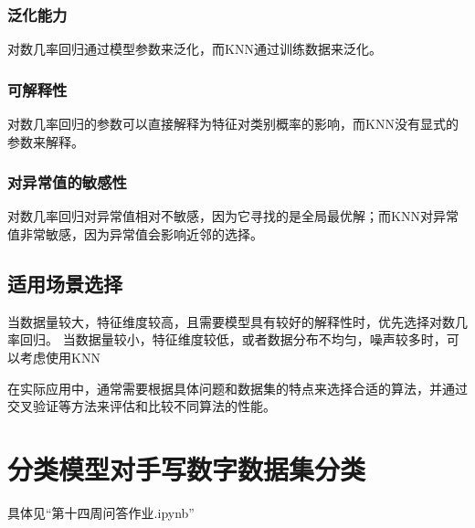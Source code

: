 \documentclass[10pt]{article}
\begin{document}
\subsubsection{泛化能力}对数几率回归通过模型参数来泛化，而KNN通过训练数据来泛化。
	\subsubsection{可解释性}对数几率回归的参数可以直接解释为特征对类别概率的影响，而KNN没有显式的参数来解释。
\subsubsection{对异常值的敏感性}对数几率回归对异常值相对不敏感，因为它寻找的是全局最优解；而KNN对异常值非常敏感，因为异常值会影响近邻的选择。
	
	\subsection{适用场景选择}
	当数据量较大，特征维度较高，且需要模型具有较好的解释性时，优先选择对数几率回归。
	当数据量较小，特征维度较低，或者数据分布不均匀，噪声较多时，可以考虑使用KNN\par
	在实际应用中，通常需要根据具体问题和数据集的特点来选择合适的算法，并通过交叉验证等方法来评估和比较不同算法的性能。
	
	
	\section{分类模型对手写数字数据集分类}
	具体见“第十四周问答作业.ipynb”
	
\end{document}
